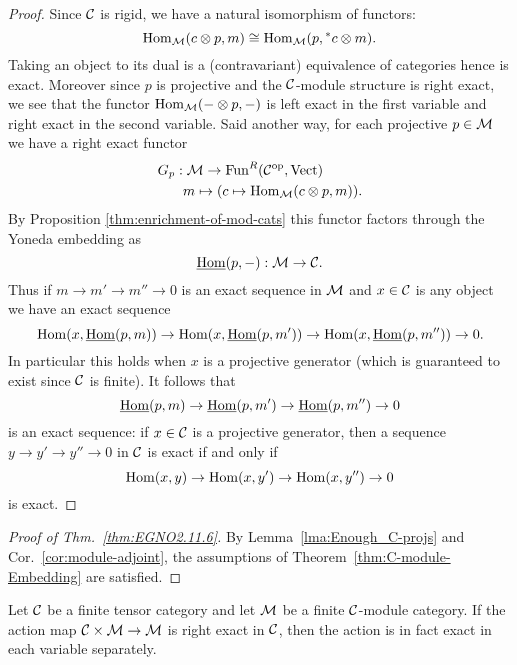 \documentclass{amsart}
\begin{document}
\begin{proof}
	Since $\mathcal C$ is rigid, we have a natural isomorphism of functors:
\begin{equation*}
	\operatorname{Hom}_{\mathcal M}(c \otimes p, m) \cong \operatorname{Hom}_{\mathcal M}(p, {}^*c \otimes m).
\end{equation*}
Taking an object to its dual is a (contravariant) equivalence of categories hence is exact. Moreover since $p$ is projective and the $\mathcal C$-module structure is right exact, we see that the functor $\operatorname{Hom}_{\mathcal M}(- \otimes p, -)$ is left exact in the first variable and right exact in the second variable. Said another way, for each projective $p \in \mathcal M$ we have a right exact functor
\begin{align*}
	G_p: & \; \mathcal M \to \operatorname{Fun}^R(\mathcal C^{\mathrm{op}}, \mathrm{Vect}) \\
	& m \mapsto (c \mapsto \operatorname{Hom}_{\mathcal M}(c \otimes p, m)).
\end{align*}  
By Proposition \ref{thm:enrichment-of-mod-cats} this functor factors through the Yoneda embedding as
\begin{equation*}
	\operatorname{\underline{Hom}}(p, -): \mathcal M \to \mathcal C.
\end{equation*}
Thus if $m \to m' \to m'' \to 0$ is an exact sequence in $\mathcal M$ and $x \in \mathcal C$ is any object we have an exact sequence
\begin{equation*}
	\operatorname{Hom}(x, \operatorname{\underline{Hom}}(p,m)) \to \operatorname{Hom}(x, \operatorname{\underline{Hom}}(p,m')) \to \operatorname{Hom}(x, \operatorname{\underline{Hom}}(p,m'')) \to 0.
\end{equation*}
In particular this holds when $x$ is a projective generator (which is guaranteed to exist since $\mathcal C$ is finite). It follows that 
\begin{equation*}
	\operatorname{\underline{Hom}}(p,m) \to \operatorname{\underline{Hom}}(p,m') \to \operatorname{\underline{Hom}}(p,m'') \to 0
\end{equation*}
is an exact sequence: if $x \in \mathcal C$ is a projective generator, then a sequence $y \to y' \to y'' \to 0$ in $\mathcal C$ is exact if and only if 
\begin{equation*}
	\operatorname{Hom}(x, y) \to \operatorname{Hom}(x, y') \to \operatorname{Hom}(x, y'') \to 0
\end{equation*} 
is exact. 
\end{proof}




\begin{proof}[Proof of Thm.~\ref{thm:EGNO2.11.6}]
By Lemma~\ref{lma:Enough_C-projs} and Cor.~\ref{cor:module-adjoint}, the assumptions of Theorem~\ref{thm:C-module-Embedding} are satisfied.
\end{proof}

\begin{corollary} \label{cor:biexact_action}
	Let $\mathcal C$ be a finite tensor category and let $\mathcal M$ be a finite $\mathcal C$-module category. If the action map $\mathcal C \times \mathcal M \to \mathcal M$ is right exact in $\mathcal C$, then the action is in fact exact in each variable separately.  
\end{corollary}
\end{document}
